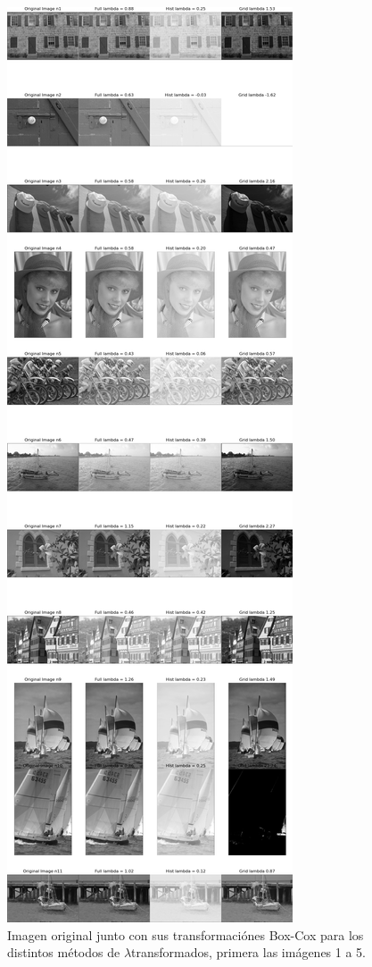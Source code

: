 \begin{figure}
    \centering
    \includegraphics[width=\textwidth]{figuras/img_BCI_all_1.png}
    \caption{Imagen original junto con sus transformaci\'ones Box-Cox para los distintos m\'etodos de $\lambda$transformados, primera las im\'agenes 1 a 5.}
\end{figure}

